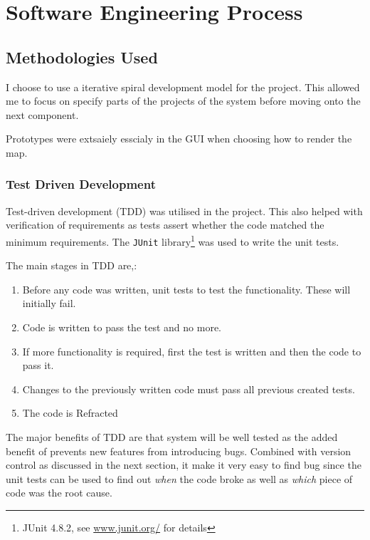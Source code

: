 \section{Software Engineering Process}

\subsection{Methodologies Used}
\label{sub:methodologies_used}

I choose to use a iterative spiral development model for the project. This allowed me to focus on specify parts of the projects of the system before moving onto the next component. 

Prototypes were extsaiely esscialy in the GUI when choosing how to render the map. %


\subsubsection{Test Driven Development}
Test-driven development (TDD) was utilised in the project. This also helped with verification of requirements as tests assert whether the code matched the minimum requirements. The \texttt{JUnit} library\footnote{JUnit 4.8.2, see \url{www.junit.org/} for details } was used to write the unit tests.  

The main stages in TDD are\cite{murphytest},\cite{desai2008survey}:
\begin{enumerate}[noitemsep ]
	\item Before any code was written, unit tests to test the functionality. These will initially fail.
   \item Code is written to pass the test and no more.
   \item If more functionality is required, first the test is written and then the code to pass it.
   \item Changes to the previously written code must pass all previous created tests.
   \item The code is Refracted 
\end{enumerate}

The major benefits of TDD are that system will be well tested as the added benefit of prevents new features from introducing bugs. Combined with version control as discussed in the next section, it make it very easy to find bug since the unit tests can be used to find out \emph{when} the code broke as well as \emph{which} piece of code was the root cause.

